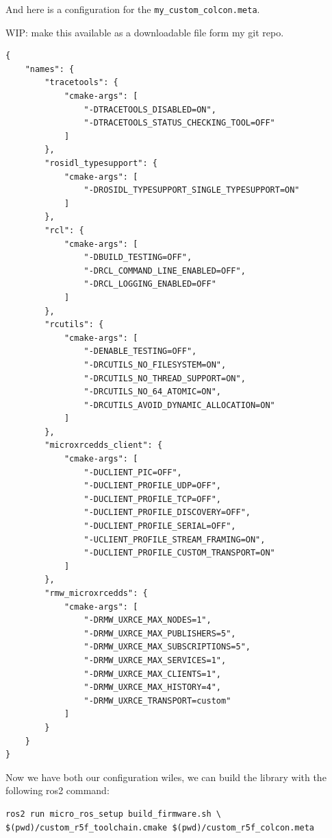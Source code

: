 \documentclass[10pt]{article}
\begin{document}
And here is a configuration for the \verb|my_custom_colcon.meta|.

WIP: make this available as a downloadable file form my git repo.
\begin{tcolorbox}
\begin{verbatim}
{
    "names": {
        "tracetools": {
            "cmake-args": [
                "-DTRACETOOLS_DISABLED=ON",
                "-DTRACETOOLS_STATUS_CHECKING_TOOL=OFF"
            ]
        },
        "rosidl_typesupport": {
            "cmake-args": [
                "-DROSIDL_TYPESUPPORT_SINGLE_TYPESUPPORT=ON"
            ]
        },
        "rcl": {
            "cmake-args": [
                "-DBUILD_TESTING=OFF",
                "-DRCL_COMMAND_LINE_ENABLED=OFF",
                "-DRCL_LOGGING_ENABLED=OFF"
            ]
        },
        "rcutils": {
            "cmake-args": [
                "-DENABLE_TESTING=OFF",
                "-DRCUTILS_NO_FILESYSTEM=ON",
                "-DRCUTILS_NO_THREAD_SUPPORT=ON",
                "-DRCUTILS_NO_64_ATOMIC=ON",
                "-DRCUTILS_AVOID_DYNAMIC_ALLOCATION=ON"
            ]
        },
        "microxrcedds_client": {
            "cmake-args": [
                "-DUCLIENT_PIC=OFF",
                "-DUCLIENT_PROFILE_UDP=OFF",
                "-DUCLIENT_PROFILE_TCP=OFF",
                "-DUCLIENT_PROFILE_DISCOVERY=OFF",
                "-DUCLIENT_PROFILE_SERIAL=OFF",
                "-UCLIENT_PROFILE_STREAM_FRAMING=ON",
                "-DUCLIENT_PROFILE_CUSTOM_TRANSPORT=ON"
            ]
        },
        "rmw_microxrcedds": {
            "cmake-args": [
                "-DRMW_UXRCE_MAX_NODES=1",
                "-DRMW_UXRCE_MAX_PUBLISHERS=5",
                "-DRMW_UXRCE_MAX_SUBSCRIPTIONS=5",
                "-DRMW_UXRCE_MAX_SERVICES=1",
                "-DRMW_UXRCE_MAX_CLIENTS=1",
                "-DRMW_UXRCE_MAX_HISTORY=4",
                "-DRMW_UXRCE_TRANSPORT=custom"
            ]
        }
    }
}
\end{verbatim}
\end{tcolorbox}

Now we have both our configuration wiles, we can build the library with the following ros2 command:
\begin{tcolorbox}
\begin{verbatim}
ros2 run micro_ros_setup build_firmware.sh \
$(pwd)/custom_r5f_toolchain.cmake $(pwd)/custom_r5f_colcon.meta
\end{verbatim}
\end{tcolorbox}
\end{document}

